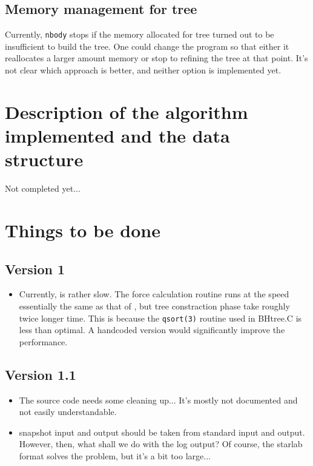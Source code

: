 \subsection{Memory management for tree}

Currently, {\tt nbody} stops if the memory allocated for tree turned
out to be insufficient to build the tree. One could change the program 
so that either it reallocates a  larger amount memory or stop to
refining the tree at that point. It's not clear which approach is
better, and neither option is implemented yet.

\section{Description of the algorithm implemented and the data
structure}

Not completed yet...



\section{Things to be done}

\subsection{Version 1}
\begin{itemize}
\item Currently, \nbody is rather slow. The force calculation routine runs
at the speed essentially the same as that of \vcode, but tree
constraction phase take roughly twice longer time. This is because the 
{\tt qsort(3)} routine used in BHtree.C is less than optimal. A
handcoded version would significantly improve the performance.
\end{itemize}

\subsection{Version 1.1}
\begin{itemize}
\item The source code needs some cleaning up... It's mostly not
documented and not easily understandable.

\item snapshot input and output should be taken from standard input
and output. However, then, what shall we do with the log output? Of
course, the starlab  format solves the problem, but it's a bit too
large... 
\end{itemize}










